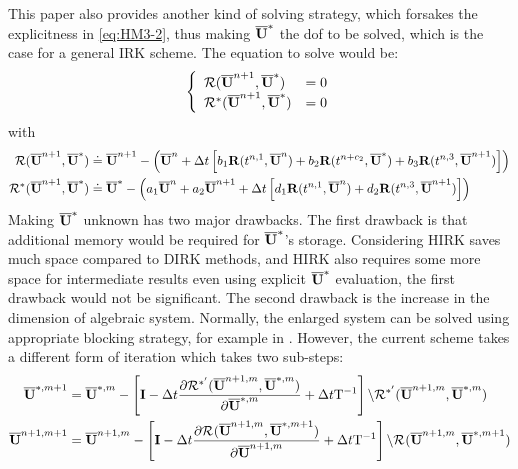 \documentclass[preprint,12pt]{elsarticle}
\begin{document}
This paper also provides another kind of
solving strategy,
which forsakes the explicitness in \eqref{eq:HM3-2},
thus making $\overline{\mathbf{U}}^*$ the dof to be solved,
which is the case for a general IRK scheme.
The equation to solve would be:
\begin{equation}
    \begin{aligned}
         & \left\{
        \begin{array}[2]{ll}
            \Res(\uu^{n+1},\uu^{*})   & = 0 \\
            \Res^*(\uu^{n+1},\uu^{*}) & = 0 \\
        \end{array}
        \right.    \\
    \end{aligned}
\end{equation}
with
\begin{equation}
    \begin{aligned}
        \mathcal{R}(\overline{\mathbf{U}}^{n+1},\overline{\mathbf{U}}^{*})   & \doteq \overline{\mathbf{U}}^{n+1} - \left(
        \overline{\mathbf{U}}^{n} +
        \mathrm\Delta t
        \left[
            b_1\mathbf{R}(t^{n,1}, \overline{\mathbf{U}}^n) +
            b_2\mathbf{R}(t^{n+c_2}, \overline{\mathbf{U}}^*) +
            b_3\mathbf{R}(t^{n,3}, \overline{\mathbf{U}}^{n+1})
            \right]
        \right)                                               \\
        \mathcal{R}^*(\overline{\mathbf{U}}^{n+1},\overline{\mathbf{U}}^{*}) & \doteq\overline{\mathbf{U}}^{*} - \left(
        a_1\overline{\mathbf{U}}^{n} +
        a_2\overline{\mathbf{U}}^{n+1} +
        \mathrm\Delta t
        \left[
            d_1\mathbf{R}(t^{n,1}, \overline{\mathbf{U}}^n) +
            d_2\mathbf{R}(t^{n,3}, \overline{\mathbf{U}}^{n+1})
            \right]
        \right)
    \end{aligned}
\end{equation}
Making $\overline{\mathbf{U}}^*$ unknown has two major drawbacks.
The first drawback is that additional memory
would be required for $\overline{\mathbf{U}}^*$'s storage.
Considering HIRK saves much space compared to
DIRK methods, and HIRK also requires some more space
for intermediate results even using explicit $\overline{\mathbf{U}}^*$ evaluation,
the first drawback would not be significant.
The second drawback is the increase in the dimension of
algebraic system.
Normally, the enlarged system can be solved
using appropriate blocking strategy,
for example in \cite{pazner2017stage}.
However, the current scheme takes a different form of
iteration which takes two sub-steps:
\begin{equation}
    \label{eq:intersolve}
    \begin{aligned}
        \overline{\mathbf{U}}^{*,m+1}   & = \overline{\mathbf{U}}^{*,m} - \left[
            \mathbf{I} - \mathrm\Delta t \frac{\partial \mathcal{R}^{*'}(\overline{\mathbf{U}}^{n+1,m},\overline{\mathbf{U}}^{*,m})}
            {\partial \overline{\mathbf{U}}^{*,m}}
            + \mathrm\Delta t \mathrm{T}^{-1}
            \right]
        \backslash \mathcal{R}^{*'}(\overline{\mathbf{U}}^{n+1,m},\overline{\mathbf{U}}^{*,m}) \\
        \overline{\mathbf{U}}^{n+1,m+1} & = \overline{\mathbf{U}}^{n+1,m} - \left[
            \mathbf{I} - \mathrm\Delta t \frac{\partial \mathcal{R}^{}(\overline{\mathbf{U}}^{n+1,m},\overline{\mathbf{U}}^{*,m+1})}
            {\partial \overline{\mathbf{U}}^{n+1,m}}
            + \mathrm\Delta t \mathrm{T}^{-1}
            \right]
        \backslash \mathcal{R}^{}(\overline{\mathbf{U}}^{n+1,m},\overline{\mathbf{U}}^{*,m+1}) \\
    \end{aligned}
\end{equation}
\end{document}

